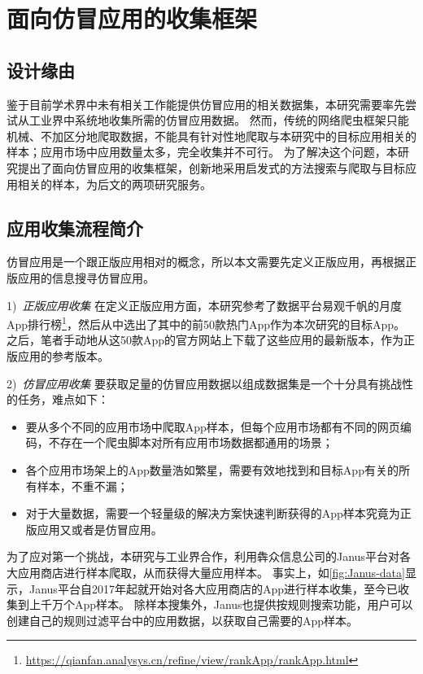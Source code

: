 \chapter{面向仿冒应用的收集框架\mytool}
\label{chp:fakerevealer}

\section{设计缘由}
鉴于目前学术界中未有相关工作能提供仿冒应用的相关数据集，本研究需要率先尝试从工业界中系统地收集所需的仿冒应用数据。
然而，传统的网络爬虫框架只能机械、不加区分地爬取数据，不能具有针对性地爬取与本研究中的目标应用相关的样本；应用市场中应用数量太多，完全收集并不可行。
为了解决这个问题，本研究提出了面向仿冒应用的收集框架\mytool，创新地采用启发式的方法搜索与爬取与目标应用相关的样本，为后文的两项研究服务。

\section{应用收集流程简介}
仿冒应用是一个跟正版应用相对的概念，所以本文需要先定义正版应用，再根据正版应用的信息搜寻仿冒应用。

1)\ \emph{正版应用收集} \quad
在定义正版应用方面，本研究参考了数据平台易观千帆的月度App排行榜\footnote{\url{https://qianfan.analysys.cn/refine/view/rankApp/rankApp.html}}，然后从中选出了其中的前50款热门App作为本次研究的目标App。
之后，笔者手动地从这50款App的官方网站上下载了这些应用的最新版本，作为正版应用的参考版本。

2)\ \emph{仿冒应用收集} \quad
要获取足量的仿冒应用数据以组成数据集是一个十分具有挑战性的任务，难点如下：
\begin{itemize}
	\item 要从多个不同的应用市场中爬取App样本，但每个应用市场都有不同的网页编码，不存在一个爬虫脚本对所有应用市场数据都通用的场景；
	\item 各个应用市场架上的App数量浩如繁星，需要有效地找到和目标App有关的所有样本，不重不漏；
	\item 对于大量数据，需要一个轻量级的解决方案快速判断获得的App样本究竟为正版应用又或者是仿冒应用。
\end{itemize}

为了应对第一个挑战，本研究与工业界合作，利用犇众信息公司的Janus平台对各大应用商店进行样本爬取，从而获得大量应用样本。
事实上，如\autoref{fig:Janus-data}显示，Janus平台自2017年起就开始对各大应用商店的App进行样本收集，至今已收集到上千万个App样本。
除样本搜集外，Janus也提供按规则搜索功能，用户可以创建自己的规则过滤平台中的应用数据，以获取自己需要的App样本。

